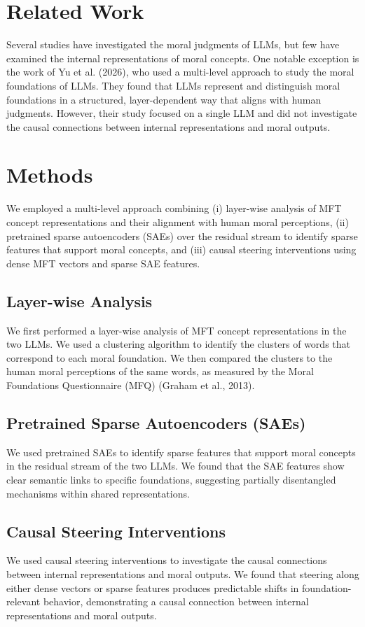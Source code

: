 \documentclass{article}
\begin{document}
\section{Related Work}
Several studies have investigated the moral judgments of LLMs, but few have examined the internal representations of moral concepts. One notable exception is the work of Yu et al. (2026), who used a multi-level approach to study the moral foundations of LLMs. They found that LLMs represent and distinguish moral foundations in a structured, layer-dependent way that aligns with human judgments. However, their study focused on a single LLM and did not investigate the causal connections between internal representations and moral outputs.

\section{Methods}
We employed a multi-level approach combining (i) layer-wise analysis of MFT concept representations and their alignment with human moral perceptions, (ii) pretrained sparse autoencoders (SAEs) over the residual stream to identify sparse features that support moral concepts, and (iii) causal steering interventions using dense MFT vectors and sparse SAE features.

\subsection{Layer-wise Analysis}
We first performed a layer-wise analysis of MFT concept representations in the two LLMs. We used a clustering algorithm to identify the clusters of words that correspond to each moral foundation. We then compared the clusters to the human moral perceptions of the same words, as measured by the Moral Foundations Questionnaire (MFQ) (Graham et al., 2013).

\subsection{Pretrained Sparse Autoencoders (SAEs)}
We used pretrained SAEs to identify sparse features that support moral concepts in the residual stream of the two LLMs. We found that the SAE features show clear semantic links to specific foundations, suggesting partially disentangled mechanisms within shared representations.

\subsection{Causal Steering Interventions}
We used causal steering interventions to investigate the causal connections between internal representations and moral outputs. We found that steering along either dense vectors or sparse features produces predictable shifts in foundation-relevant behavior, demonstrating a causal connection between internal representations and moral outputs.
\end{document}
